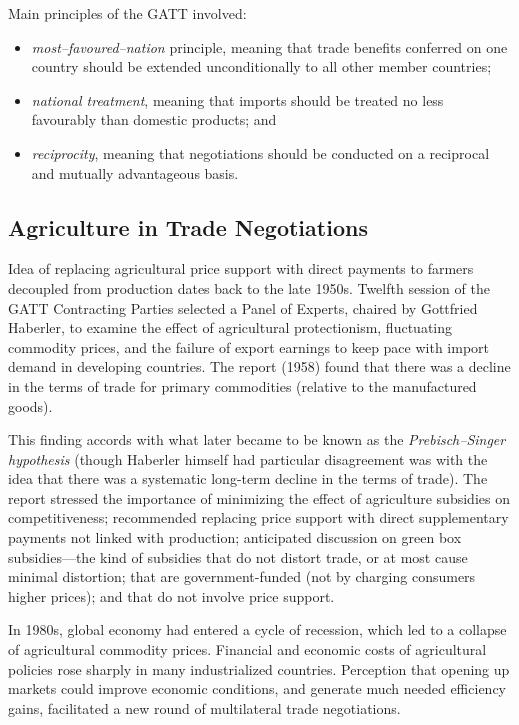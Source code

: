 \documentclass[
  oneside]{book}
\providecommand{\tightlist}{%
  \setlength{\itemsep}{0pt}\setlength{\parskip}{0pt}}
\begin{document}
Main principles of the GATT involved:

\begin{itemize}
\tightlist
\item
  \emph{most--favoured--nation} principle, meaning that trade benefits conferred on one country should be extended unconditionally to all other member countries;
\item
  \emph{national treatment}, meaning that imports should be treated no less favourably than domestic products; and
\item
  \emph{reciprocity}, meaning that negotiations should be conducted on a reciprocal and mutually advantageous basis.
\end{itemize}

\hypertarget{agriculture-in-trade-negotiations}{%
\subsection{Agriculture in Trade Negotiations}\label{agriculture-in-trade-negotiations}}

Idea of replacing agricultural price support with direct payments to farmers decoupled from production dates back to the late 1950s. Twelfth session of the GATT Contracting Parties selected a Panel of Experts, chaired by Gottfried Haberler, to examine the effect of agricultural protectionism, fluctuating commodity prices, and the failure of export earnings to keep pace with import demand in developing countries. The report (1958) found that there was a decline in the terms of trade for primary commodities (relative to the manufactured goods).

This finding accords with what later became to be known as the \emph{Prebisch--Singer hypothesis} (though Haberler himself had particular disagreement was with the idea that there was a systematic long-term decline in the terms of trade). The report stressed the importance of minimizing the effect of agriculture subsidies on competitiveness; recommended replacing price support with direct supplementary payments not linked with production; anticipated discussion on green box subsidies---the kind of subsidies that do not distort trade, or at most cause minimal distortion; that are government-funded (not by charging consumers higher prices); and that do not involve price support.

In 1980s, global economy had entered a cycle of recession, which led to a collapse of agricultural commodity prices. Financial and economic costs of agricultural policies rose sharply in many industrialized countries. Perception that opening up markets could improve economic conditions, and generate much needed efficiency gains, facilitated a new round of multilateral trade negotiations.
\end{document}
